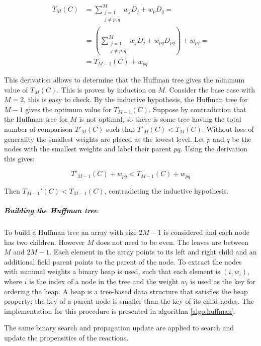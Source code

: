         \begin{align*}
          T_M(C) &= \sum\limits_{\substack{j=1\\j\neq p,q}}^Mw_jD_j +w_pD_q =\\
                 &= \left(\sum\limits_{\substack{j=1\\j\neq p,q}}^Mw_jD_j + w_{pq}D_{pq}\right) + w_{pq}=\\
                 &= T_{M-1}(C)+w_{pq}
        \end{align*}

        This derivation allows to determine that the Huffman tree gives the minimum value of $T_M(C)$.
        This is proven by induction on $M$.
        Consider the base case with $M=2$, this is easy to check.
        By the inductive hypothesis, the Huffman tree for $M-1$ gives the optimum value for $T_{M-1}(C)$.
        Suppose by contradiction that the Huffman tree for $M$ is not optimal, so there is some tree having the total number of comparison $T'_{M}(C)$ such that $T'_M(C)<T_M(C)$.
        Without loss of generality the smallest weights are placed at the lowest level.
        Let $p$ and $q$ be the nodes with the smallest weights and label their parent $pq$.
        Using the derivation this gives:

        $$T'_{M-1}(C) +w_{pq}< T_{M-1}(C)+w_{pq}$$

        Then $T_{M-1}'(C)< T_{M-1}(C)$, contradicting the inductive hypothesis.

        \subparagraph{Building the Huffman tree}
        To build a Huffman tree an array with size $2M-1$ is considered and each node has two children.
        However $M$ does not need to be even.
        The leaves are between $M$ and $2M-1$.
        Each element in the array points to its left and right child and an additional field parent points to the parent of the node.
        To extract the nodes with minimal weights a binary heap is used, such that each element is $(i,w_i)$, where $i$ is the index of a node in the tree and the weight $w_i$ is used as the key for ordering the heap.
        A heap is a tree-based data structure that satisfies the heap property: the key of a parent node is smaller than the key of its child nodes.
        The implementation for this procedure is presented in algorithm \ref{algo:huffman}.

        

        The same binary search and propagation update are applied to search and update the propensities of the reactions.

